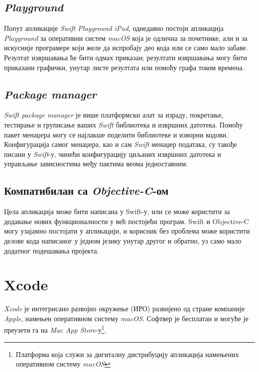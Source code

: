 \documentclass[12pt,oneside]{memoir}
\begin{document}
\subsection{\textit{Playground}}
\indent Попут апликације \textit{Swift Playground iPad}, однедавно постоји апликација \textit{Playground} за оперативни систем \textit{macOS} која је одлична за почетнике, али и за искусније програмере који желе да испробају део кода или се само мало забаве. Резултат извршавања ће бити одмах приказан; резултати извршавања могу бити приказани графички, унутар листе резултата или помоћу графа током времена. 

\subsection{\textit{Package manager}}

\textit{Swift package manager} је више платформски алат за израду, покретање, тестирање и груписање ваших \textit{Swift} библиотека и извршних датотека. Помоћу пакет менаџера могу се најлакше поделити библиотеке и изворни кодови. Конфигурација самог менаџера, као и сам \textit{Swift} менаџер података, су такође писани у \textit{Swift}-у, чинећи конфигурацију циљаних извршних датотека и управљање зависностима међу пактима веома једноставним. 

\subsection{Компатибилан са \textit{Objective-C}-ом}

Цела апликација може бити написана у Swift-у, или се може користити за додавање нових функционалности у већ постојећи програм. Swift и Objective-C могу узајамно постојати у апликацији, и корисник без проблема може користити делове кода написаног у једном језику унутар другог и обратно, уз само мало додатног подешавања пројекта. \cite{Apple_Developer}

\section{Xcode}
\label{sec:Xcode}

\indent \textit{Xcode} је интегрисано развојно окружење (ИРО) развијено од стране компаније \textit{Apple}, намењен оперативном систему \textit{macOS}. Софтвер је бесплатан и могуће је преузети га на \textit{Mac App Store}-у\footnote{Платформа која служи за дигиталну дистрибуцију апликација намењених оперативном систему \textit{macOS}}.
\end{document}
